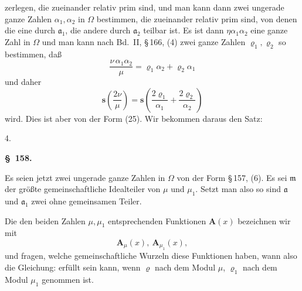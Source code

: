 zerlegen, die zueinander relativ prim sind, und man kann dann
zwei ungerade ganze Zahlen $\alpha_1, \alpha_2$ in $\Omega$ bestimmen, die zueinander
relativ prim sind, von denen die eine durch $\mathfrak{a}_1$, die andere
durch $\mathfrak{a}_2$ teilbar ist. Es ist dann $\eta\alpha_1\alpha_2$ eine ganze Zahl in $\Omega$
und man kann nach Bd.\ II, \S\,166, (4) zwei ganze Zahlen $\varrho_1, \varrho_2$
so bestimmen, da\ss{}
\[
\frac{\nu\,\alpha_1\alpha_2}{\mu} = \varrho_1\alpha_2 + \varrho_2\alpha_1
\]
und daher
\[
\boldsymbol{s}\!\left(\frac{2\nu}{\mu}\right) = \boldsymbol{s}\!\left(\frac{2\varrho_1}{\alpha_1} + \frac{2\varrho_2}{\alpha_2}\right)
\]
wird. Dies ist aber von der Form (25). Wir bekommen daraus
den Satz:

4. 

\begin{center}
\textbf{\S\ 158. }
\end{center}

Es seien jetzt
zwei ungerade ganze Zahlen in $\Omega$ von der Form \S\,157, (6). Es
sei $\mathfrak{m}$ der gr\"o\ss te gemeinschaftliche Idealteiler von $\mu$ und $\mu_1$.
Setzt man also
so sind $\mathfrak{a}$ und $\mathfrak{a}_1$ zwei  ohne gemeinsamen
Teiler.

Die den beiden Zahlen $\mu, \mu_1$ entsprechenden Funktionen $\boldsymbol{A}(x)$
bezeichnen wir mit
\[
\boldsymbol{A}_\mu(x), \ \boldsymbol{A}_{\mu_1}(x),
\]
und fragen, welche gemeinschaftliche Wurzeln diese Funktionen
haben, wann also die Gleichung:
erf\"ullt sein kann, wenn $\varrho$ nach dem Modul $\mu$, $\varrho_1$ nach dem Modul $\mu_1$
genommen ist.

